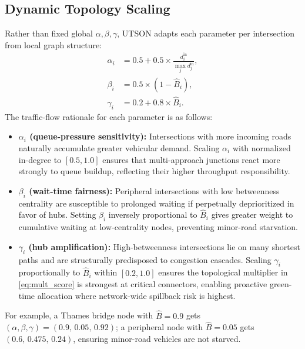 \documentclass[letterpaper, conference]{IEEEtran}
\begin{document}
\subsection{Dynamic Topology Scaling}
\label{subsec:dynamic_scaling}
Rather than fixed global $\alpha,\beta,\gamma$, UTSON adapts each parameter per intersection from local graph structure:
\begin{align}
\alpha_i &= 0.5 + 0.5\times\tfrac{d_i^{\mathrm{in}}}{\max_j d_j^{\mathrm{in}}}, \label{eq:alpha}\\
\beta_i  &= 0.5\times(1-\hat{B}_i), \label{eq:beta}\\
\gamma_i &= 0.2 + 0.8\times\hat{B}_i. \label{eq:gamma}
\end{align}
The traffic-flow rationale for each parameter is as follows:
\begin{itemize}
\item \textbf{$\alpha_i$ (queue-pressure sensitivity):} Intersections with more incoming roads naturally accumulate greater vehicular demand. Scaling $\alpha_i$ with normalized in-degree to $[0.5, 1.0]$ ensures that multi-approach junctions react more strongly to queue buildup, reflecting their higher throughput responsibility.
\item \textbf{$\beta_i$ (wait-time fairness):} Peripheral intersections with low betweenness centrality are susceptible to prolonged waiting if perpetually deprioritized in favor of hubs. Setting $\beta_i$ inversely proportional to $\hat{B}_i$ gives greater weight to cumulative waiting at low-centrality nodes, preventing minor-road starvation.
\item \textbf{$\gamma_i$ (hub amplification):} High-betweenness intersections lie on many shortest paths and are structurally predisposed to congestion cascades. Scaling $\gamma_i$ proportionally to $\hat{B}_i$ within $[0.2, 1.0]$ ensures the topological multiplier in \eqref{eq:mult_score} is strongest at critical connectors, enabling proactive green-time allocation where network-wide spillback risk is highest.
\end{itemize}
For example, a Thames bridge node with $\hat{B}{=}0.9$ gets $(\alpha,\beta,\gamma)=(0.9,\,0.05,\,0.92)$; a peripheral node with $\hat{B}{=}0.05$ gets $(0.6,\,0.475,\,0.24)$, ensuring minor-road vehicles are not starved.
\end{document}
